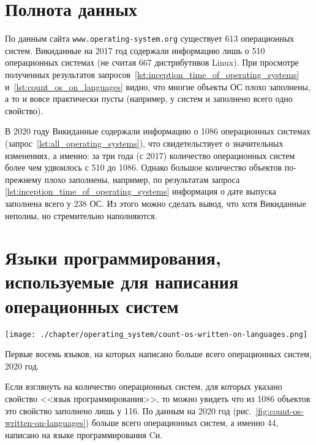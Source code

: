 \newpage
\section{Полнота данных}
По данным сайта \verb|www.operating-system.org| существует 613 операционных систем\autocite{list_operating_systems}. 
Викиданные на 2017 год содержали информацию лишь о 510 операционных системах 
(не считая \num{667} дистрибутивов Linux\autocite{list_operating_systems}). 
При просмотре полученных результатов 
запросов~\ref{lst:inception_time_of_operating_systems} и~\ref{lst:count_os_on_languages} видно, 
что многие объекты ОС плохо заполнены, а то и вовсе практически пусты 
(например, у систем  и  заполнено всего одно свойство\autocite{prowd_os_link}).

В 2020 году Викиданные содержали информацию о 1086 операционных системах 
(запрос~\ref{lst:all_operating_systems}), что свидетельствует о значительных изменениях, 
а именно: за три года (с 2017) количество операционных систем более чем удвоилось с 510 до 1086. 
Однако большое количество объектов по-прежнему плохо заполнены, 
например, по результатам запроса \ref{lst:inception_time_of_operating_systems} 
информация о дате выпуска заполнена всего у 238 ОС. 
Из этого можно сделать вывод, что хотя Викиданные неполны, но стремительно наполняются.




\section{Языки программирования, используемые для написания операционных систем}
%
\begin{marginfigure}[0\baselineskip]
	\texttt{[image: ./chapter/operating\_system/count-os-written-on-languages.png]}
    \caption[Первые языки, на которых написано больше всего ОС, 2020 год.]{Первые восемь языков, на которых написано больше всего операционных систем, 2020 год.}
	\label{fig:count-os-written-on-languages}
\end{marginfigure}

Если взглянуть на количество операционных систем, для которых указано свойство <<язык программирования>>, то можно увидеть что из \num{1086} объектов это свойство заполнено лишь у \num{116}. По данным на 2020 год (рис.~\ref{fig:count-os-written-on-languages}) больше всего операционных систем, а именно 44, написано на языке программирования Cи.




